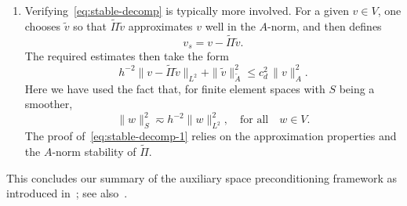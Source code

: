\documentclass[11pt]{article}
\theoremstyle{remark}
\begin{document}
\begin{enumerate}[{\bf {\thesubsection}.1.}]
\item Verifying~\eqref{eq:stable-decomp} is typically more involved. For a given $v\in V$, one chooses $\widetilde{v}$ so that $\widetilde{\Pi}\widetilde{v}$ approximates $v$ well in the $A$-norm, and then defines
\begin{equation}
  v_s = v - \widetilde{\Pi}\widetilde{v}.
\end{equation}
The required estimates then take the form
\begin{equation}\label{eq:stable-decomp-1}
  h^{-2}\|v - \widetilde{\Pi}\widetilde{v}\|_{L^2} + 
  \|\widetilde{v}\|_{\widetilde{A}}^2 \le c_d^2\,\|v\|_A^2.
\end{equation}
Here we have used the fact that, for finite element spaces with $S$ being a smoother,
\[
\|w\|_S^2 \eqsim h^{-2}\|w\|_{L^2}^2, \quad \mbox{for all}\quad w \in V.
\]
The proof of~\eqref{eq:stable-decomp-1} relies on the approximation properties and the $A$-norm stability of $\widetilde{\Pi}$.
\end{enumerate}

This concludes our summary of the auxiliary space preconditioning framework as introduced in~\cite{Xu1996}; see also~\cite{HiptmairXu2007}.



\end{document}
